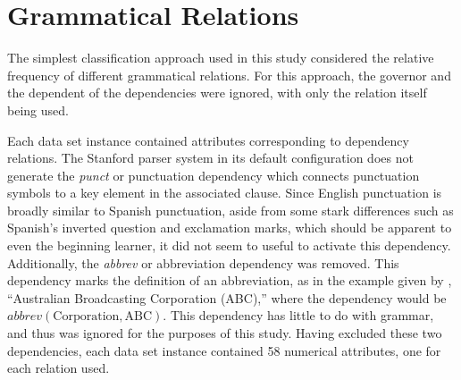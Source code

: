\documentclass[main.tex]{subfiles}
\begin{document}
\section{Grammatical Relations}

The simplest classification approach used in this study considered the relative frequency of different grammatical relations. For this approach, the governor and the dependent of the dependencies were ignored, with only the relation itself being used. 

Each data set instance contained attributes corresponding to dependency relations. The Stanford parser system in its default configuration does not generate the \textit{punct} or punctuation dependency which connects punctuation symbols to a key element in the associated clause. Since English punctuation is broadly similar to Spanish punctuation, aside from some stark differences such as Spanish's inverted question and exclamation marks, which should be apparent to even the beginning learner, it did not seem to useful to activate this dependency. Additionally, the \textit{abbrev} or abbreviation dependency was removed. This dependency marks the definition of an abbreviation, as in the example given by \citet{typed-deps-manual}, ``Australian Broadcasting Corporation (ABC),'' where the dependency would be $abbrev(\text{Corporation},\text{ABC})$. This dependency has little to do with grammar, and thus was ignored for the purposes of this study. Having excluded these two dependencies, each data set instance contained 58 numerical attributes, one for each relation used.
\end{document}
